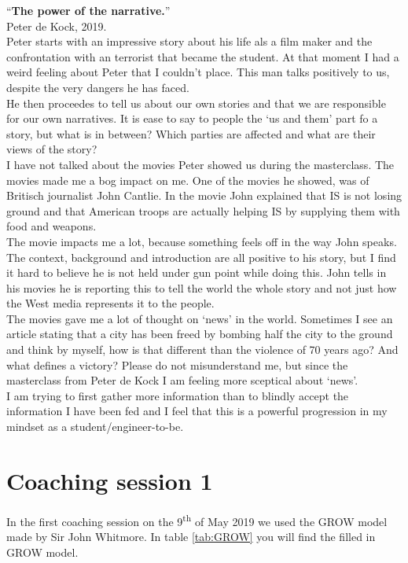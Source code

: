 \documentclass{article}
\begin{document}
``\textbf{The power of the narrative.}''\\
Peter de Kock, 2019.\\

Peter starts with an impressive story about his life als a film maker and the confrontation with an terrorist that became the student. At that moment I had a weird feeling about Peter that I couldn't place. This man talks positively to us, despite the very dangers he has faced. \\

He then proceedes to tell us about our own stories and that we are responsible for our own narratives. It is ease to say to people the `us and them' part fo a story, but what is in between? Which parties are affected and what are their views of the story?\\

I have not talked about the movies Peter showed us during the masterclass. The movies made me a bog impact on me. One of the movies he showed, was of Britisch journalist John Cantlie. In the movie John explained that IS is not losing ground and that American troops are actually helping IS by supplying them with food and weapons. \\

The movie impacts me a lot, because something feels off in the way John speaks. The context, background and introduction are all positive to his story, but I find it hard to believe he is not held under gun point while doing this. John tells in his movies he is reporting this to tell the world the whole story and not just how the West media represents it to the people.\\

The movies gave me a lot of thought on `news' in the world. Sometimes I see an article stating that a city has been freed by bombing half the city to the ground and think by myself, how is that different than the violence of 70 years ago? And what defines a victory? Please do not misunderstand me, but since the masterclass from Peter de Kock I am feeling more sceptical about `news'.\\

I am trying to first gather more information than to blindly accept the information I have been fed and I feel that this is a powerful progression in my mindset as a student/engineer-to-be.

\newpage
\section{Coaching session 1}
In the first coaching session on the 9\textsuperscript{th} of May 2019 we used the GROW model made by Sir John Whitmore. In table \ref{tab:GROW} you will find the filled in GROW model.
\end{document}
